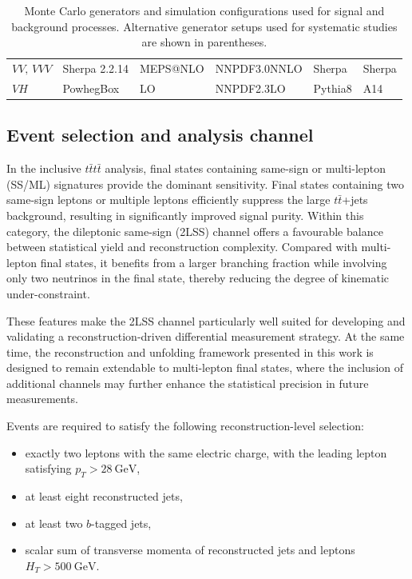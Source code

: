 \begin{table}[htbp]
\begin{tabular}{
p{1.6cm}
p{3.6cm}
p{1.9cm}
p{2.5cm}
p{2.0cm}
p{1.2cm}
}
$VV,\,VVV$ & Sherpa 2.2.14 & MEPS@NLO & NNPDF3.0NNLO & Sherpa & Sherpa \\

$VH$ & PowhegBox & LO & NNPDF2.3LO & Pythia8 & A14 \\

\bottomrule
\end{tabular}

\caption{Monte Carlo generators and simulation configurations used for signal and background processes. 
Alternative generator setups used for systematic studies are shown in parentheses.}
\label{tab:diff_mc_samples}

\end{table}

\subsection{Event selection and analysis channel}

In the inclusive $t\bar{t}t\bar{t}$ analysis, final states containing same-sign or multi-lepton (SS/ML) signatures provide the dominant sensitivity. 
Final states containing two same-sign leptons or multiple leptons efficiently suppress the large $t\bar{t}$+jets background, resulting in significantly improved signal purity.
Within this category, the dileptonic same-sign (2LSS) channel offers a favourable balance between statistical yield and reconstruction complexity. 
Compared with multi-lepton final states, it benefits from a larger branching fraction while involving only two neutrinos in the final state, thereby reducing the degree of kinematic under-constraint.

These features make the 2LSS channel particularly well suited for developing and validating a reconstruction-driven differential measurement strategy. 
At the same time, the reconstruction and unfolding framework presented in this work is designed to remain extendable to multi-lepton final states, where the inclusion of additional channels may further enhance the statistical precision in future measurements.

Events are required to satisfy the following reconstruction-level selection:

\begin{itemize}
\item exactly two leptons with the same electric charge, with the leading lepton satisfying $p_T > 28~\mathrm{GeV}$,
\item at least eight reconstructed jets,
\item at least two $b$-tagged jets,
\item scalar sum of transverse momenta of reconstructed jets and leptons $H_T > 500~\mathrm{GeV}$.
\end{itemize}

